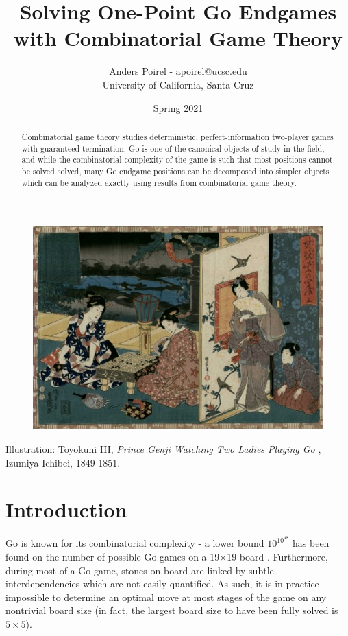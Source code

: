 \documentclass{article}
\title{Solving One-Point Go Endgames with Combinatorial Game Theory}
\author{Anders Poirel - apoirel@ucsc.edu \\ University of California, Santa Cruz}
\date{Spring 2021}
\theoremstyle{plain}
\theoremstyle{definition}
\begin{document}
\maketitle

\begin{figure}[ht]
    \centering
    \includegraphics[width=\textwidth]{final_paper/prince_genji.jpg}
\end{figure}

\begin{abstract}
    Combinatorial game theory studies deterministic, perfect-information 
    two-player games with guaranteed termination. Go is one of the canonical objects of study 
    in the field, and while the combinatorial complexity of the game is such that most positions cannot 
    be solved solved, many Go endgame positions can be decomposed into simpler objects which can be
    analyzed exactly using results from combinatorial game theory.
\end{abstract}

\newpage

Illustration: Toyokuni III, \textit{Prince Genji Watching Two Ladies Playing Go }, 
Izumiya Ichibei, 1849-1851.

\tableofcontents
\newpage 
\section{Introduction}

Go is known for its combinatorial complexity - a lower bound $10^{10^{48}}$ has 
been found on the number of possible Go games on a 19$\times$19 board \cite{senseilower}. 
Furthermore, during most of a Go game, stones on board are linked by
 subtle interdependencies which are not easily quantified. As such, it is in practice impossible 
to determine an optimal move at most stages of the game on any nontrivial board size (in fact, the 
largest board size to have been fully solved is $5\times5$).
\end{document}
